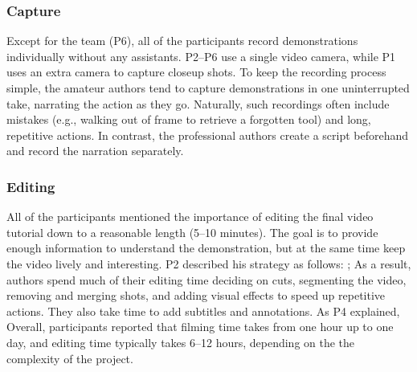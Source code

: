 \subsubsection{Capture}
Except for the team (P6), all of the participants
record demonstrations individually without any assistants. P2--P6 use
a single video camera, while P1 uses an extra camera to capture
closeup shots. To keep the recording process simple, the amateur
authors tend to capture demonstrations in one uninterrupted take,
narrating the action as they go. Naturally, such recordings often
include mistakes (e.g., walking out of frame to retrieve a forgotten tool) and long, repetitive actions. In contrast, the
professional authors create a script beforehand and record the
narration separately.


\subsubsection{Editing}
All of the participants mentioned the importance of
editing the final video tutorial down to a reasonable length (5--10
minutes). The goal is to provide enough information to understand the
demonstration, but at the same time keep the video lively and
interesting. P2 described his strategy as follows: ;  As a result, authors spend much of their editing
time deciding on cuts, segmenting the video, removing and merging shots, and adding visual
effects to speed up repetitive actions. They also take time to add
subtitles and annotations. As P4 explained,  Overall,
participants reported that filming time takes from one hour up to one
day, and editing time typically takes 6--12 hours, depending on the
the complexity of the project.

